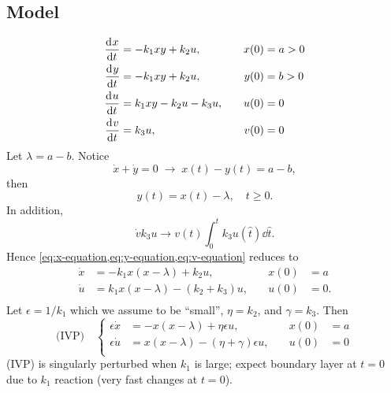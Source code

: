 \documentclass[12pt,twoside]{article}
\begin{document}
\subsection{Model}
\begin{equation*}
  \begin{aligned}
    \frac{\mathrm{d}^{} {x}}{\mathrm{d}{t}^{}} &= -k_1xy+k_2u,&\quad x(0)&=a>0 \\
    \frac{\mathrm{d}^{} {y}}{\mathrm{d}{t}^{}} &= -k_1xy+k_2u,&\quad y(0)&=b>0 \\
    \frac{\mathrm{d}^{} {u}}{\mathrm{d}{t}^{}} &= k_1xy-k_2u-k_3u,&\quad u(0)&=0 \\
    \frac{\mathrm{d}^{} {v}}{\mathrm{d}{t}^{}} &= k_3u, &\quad v(0) &= 0
  \end{aligned}
\end{equation*}
Let $\lambda = a-b$. Notice
\begin{equation}
  \label{eq:x-equation}
  \dot{x}+\dot{y}=0 \;\rightarrow\;x(t)-y(t)=a-b,
\end{equation}
then
\begin{equation}
  \label{eq:y-equation}
  y(t)=x(t)-\lambda,\quad t\ge0.
\end{equation}
In addition,
\begin{equation}
  \label{eq:v-equation}
  \dot{v}k_3u \rightarrow v(t)\int_0^tk_3u(\hat{t})\dd{\hat{t}}.
\end{equation}
Hence \cref{eq:x-equation,eq:y-equation,eq:v-equation} reduces to
\begin{equation*}
  \begin{aligned}
    \dot{x} &= -k_1x(x-\lambda) + k_2u, &\quad x(0)&=a \\
    \dot{u} &= k_1x(x-\lambda) - (k_2+k_3)u, &\quad u(0)&=0. \\
  \end{aligned}
\end{equation*}
Let $\epsilon=1/k_1$ which we assume to be ``small'', $\eta=k_2$, and
$\gamma=k_3$. Then
\begin{equation*}
  \text{(IVP)}\quad \left\{
    \begin{aligned}
      \epsilon\dot{x} &= -x(x-\lambda)+\eta\epsilon u, &\quad x(0)&=a \\
      \epsilon\dot{u} &= x(x-\lambda)-(\eta+\gamma)\epsilon u, &\quad u(0)&=0 \\
    \end{aligned}
\right.
\end{equation*}
(IVP) is singularly perturbed when $k_1$ is large; expect boundary layer at
$t=0$ due to $k_1$ reaction (very fast changes at $t=0$).
\end{document}
